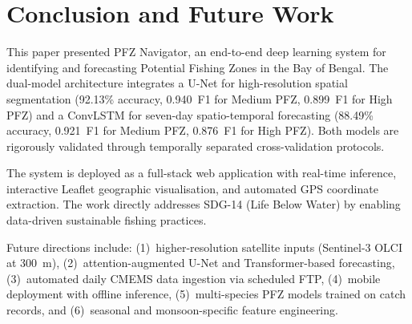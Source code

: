 \documentclass[conference]{IEEEtran}
\begin{document}
\section{Conclusion and Future Work}

This paper presented PFZ Navigator, an end-to-end deep learning
system for identifying and forecasting Potential Fishing Zones in the
Bay of Bengal. The dual-model architecture integrates a U-Net for
high-resolution spatial segmentation (92.13\% accuracy, 0.940~F1 for
Medium PFZ, 0.899~F1 for High PFZ) and a ConvLSTM for seven-day
spatio-temporal forecasting (88.49\% accuracy, 0.921~F1 for Medium
PFZ, 0.876~F1 for High PFZ). Both models are rigorously validated
through temporally separated cross-validation protocols.

The system is deployed as a full-stack web application with real-time
inference, interactive Leaflet geographic visualisation, and automated
GPS coordinate extraction. The work directly addresses SDG-14 (Life
Below Water) by enabling data-driven sustainable fishing practices.

Future directions include: (1)~higher-resolution satellite inputs
(Sentinel-3 OLCI at 300~m), (2)~attention-augmented U-Net and
Transformer-based forecasting, (3)~automated daily CMEMS data
ingestion via scheduled FTP, (4)~mobile deployment with offline
inference, (5)~multi-species PFZ models trained on catch records, and
(6)~seasonal and monsoon-specific feature engineering.
\end{document}
